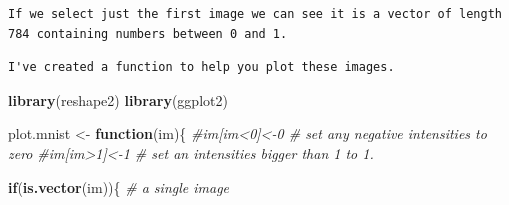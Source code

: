\documentclass[]{book}
\newenvironment{Shaded}{\begin{snugshade}}{\end{snugshade}}
\newcommand{\CommentTok}[1]{\textcolor[rgb]{0.56,0.35,0.01}{\textit{#1}}}
\newcommand{\ControlFlowTok}[1]{\textcolor[rgb]{0.13,0.29,0.53}{\textbf{#1}}}
\newcommand{\DecValTok}[1]{\textcolor[rgb]{0.00,0.00,0.81}{#1}}
\newcommand{\KeywordTok}[1]{\textcolor[rgb]{0.13,0.29,0.53}{\textbf{#1}}}
\newcommand{\NormalTok}[1]{#1}
\newcommand{\OperatorTok}[1]{\textcolor[rgb]{0.81,0.36,0.00}{\textbf{#1}}}
\newcommand{\StringTok}[1]{\textcolor[rgb]{0.31,0.60,0.02}{#1}}
\theoremstyle{definition}
\theoremstyle{definition}
\theoremstyle{definition}
\theoremstyle{remark}
\begin{document}
\begin{verbatim}
If we select just the first image we can see it is a vector of length 784 containing numbers between 0 and 1.
\end{verbatim}

\begin{Shaded}
\end{Shaded}

\begin{verbatim}
I've created a function to help you plot these images. 
\end{verbatim}

\begin{Shaded}
\begin{Highlighting}[]
\KeywordTok{library}\NormalTok{(reshape2)}
\KeywordTok{library}\NormalTok{(ggplot2)}


\NormalTok{plot.mnist <-}\StringTok{ }\ControlFlowTok{function}\NormalTok{(im)\{}
  \CommentTok{#im[im<0]<-0 # set any negative intensities to zero}
  \CommentTok{#im[im>1]<-1 # set an intensities bigger than 1 to 1.}
  
  
  \ControlFlowTok{if}\NormalTok{(}\KeywordTok{is.vector}\NormalTok{(im))\{ }\CommentTok{# a single image}
    

\end{Highlighting}
\end{Shaded}
\end{document}
